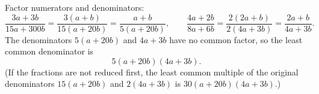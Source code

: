 Factor numerators and denominators:
\[
\dfrac{3a+3b}{15a+300b}=\dfrac{3(a+b)}{15(a+20b)}=\dfrac{a+b}{5(a+20b)},\qquad
\dfrac{4a+2b}{8a+6b}=\dfrac{2(2a+b)}{2(4a+3b)}=\dfrac{2a+b}{4a+3b}.
\]
The denominators $5(a+20b)$ and $4a+3b$ have no common factor, so the least common denominator is
\[
\boxed{5(a+20b)(4a+3b)} .
\]
(If the fractions are not reduced first, the least common multiple of the original denominators $15(a+20b)$ and $2(4a+3b)$ is $30(a+20b)(4a+3b)$.)
